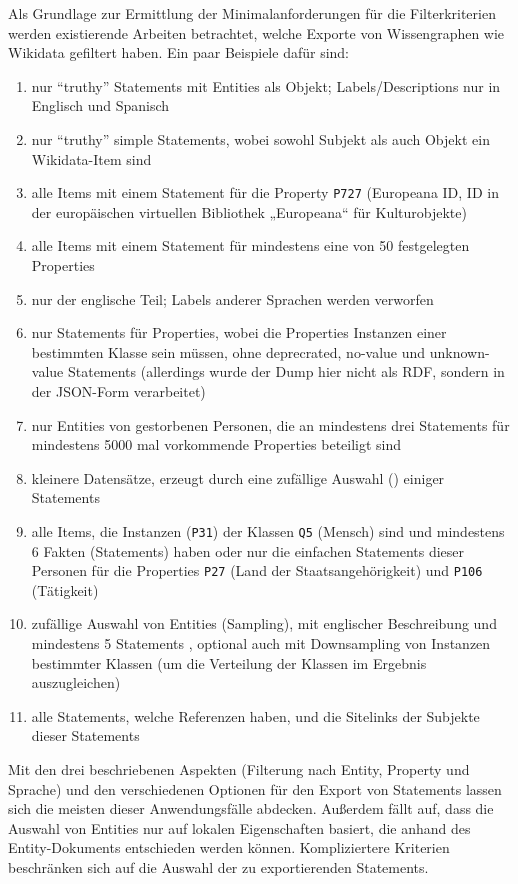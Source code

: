 Als Grundlage zur Ermittlung der Minimalanforderungen für die Filterkriterien werden existierende Arbeiten betrachtet, welche Exporte von Wissengraphen wie Wikidata gefiltert haben.
Ein paar Beispiele dafür sind:
\begin{enumerate}[label=\arabic*)]
  \item nur "`truthy"' Statements mit Entities als Objekt; Labels/Descriptions nur in Englisch und Spanisch \cite{usage-grafa}
  \item nur "`truthy"' simple Statements, wobei sowohl Subjekt als auch Objekt ein Wikidata-Item sind \cite{usage-wembedder}
  \item alle Items mit einem Statement für die Property \verb|P727| (Europeana ID, ID in der europäischen virtuellen Bibliothek „Europeana“ für Kulturobjekte) \cite{usage-europeana}
  \item alle Items mit einem Statement für mindestens eine von 50 festgelegten Properties \cite{usage-narratives} 
  \item nur der englische Teil; Labels anderer Sprachen werden verworfen \cite{usage-web-tables} 
  \item nur Statements für Properties, wobei die Properties Instanzen einer bestimmten Klasse sein müssen, ohne deprecrated, no-value und unknown-value Statements \cite{usage-implicational-knowledge} (allerdings wurde der Dump hier nicht als RDF, sondern in der JSON-Form verarbeitet)
  \item nur Entities von gestorbenen Personen, die an mindestens drei Statements für mindestens 5000 mal vorkommende Properties beteiligt sind \cite{usage-learning-structured-embeddings}
  \item kleinere Datensätze, erzeugt durch eine zufällige Auswahl () einiger Statements \cite{usage-sparql-benchmark}
  \item alle Items, die Instanzen (\verb|P31|) der Klassen \verb|Q5| (Mensch) sind und mindestens 6 Fakten (Statements) haben \cite{usage-one-sentence} oder nur die einfachen Statements dieser Personen für die Properties \verb|P27| (Land der Staatsangehörigkeit) und \verb|P106| (Tätigkeit) \cite{usage-person-networks}
  \item zufällige Auswahl von Entities (Sampling), mit englischer Beschreibung und mindestens 5 Statements \cite{usage-generate-entity-type-desc}, optional auch mit Downsampling von Instanzen bestimmter Klassen (um die Verteilung der Klassen im Ergebnis auszugleichen) \cite{usage-synthesize-entity-desc}
  \item alle Statements, welche Referenzen haben, und die Sitelinks der Subjekte dieser Statements \cite{wd-wk-common-references}
\end{enumerate}
Mit den drei beschriebenen Aspekten (Filterung nach Entity, Property und Sprache) und den verschiedenen Optionen für den Export von Statements lassen sich die meisten dieser Anwendungsfälle abdecken.
Außerdem fällt auf, dass die Auswahl von Entities nur auf lokalen Eigenschaften basiert, die anhand des Entity-Dokuments entschieden werden können. 
Kompliziertere Kriterien beschränken sich auf die Auswahl der zu exportierenden Statements.

